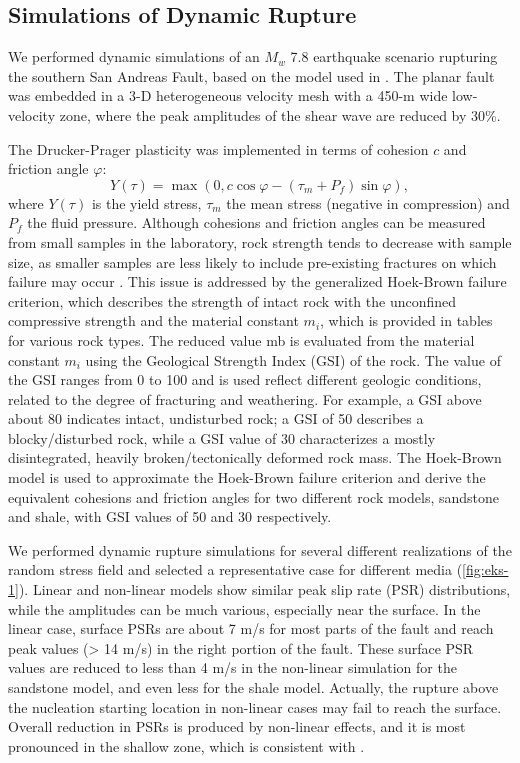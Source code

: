 \subsection{Simulations of Dynamic Rupture}
We performed dynamic simulations of an $M_w$ 7.8 earthquake scenario rupturing the southern San Andreas Fault, based on the model used in \citet{rotenOfffaultDeformationsShallow2017}. The planar fault was embedded in a 3-D heterogeneous velocity mesh \citep[SCEC CVM4;][]{magistraleSCECSouthernCalifornia2000} with a 450-m wide low-velocity zone, where the peak amplitudes of the shear wave are reduced by 30\%.

The Drucker-Prager plasticity was implemented in terms of cohesion $c$ and friction angle $\varphi$:
\begin{equation}\label{eq:eks-1}
    Y(\tau)=\max \left(0, c \cos \varphi-\left(\tau_{m}+P_{f}\right) \sin \varphi\right),
\end{equation}
where $Y(\tau)$ is the yield stress, $\tau_{m}$ the mean stress (negative in compression) and $P_f$ the fluid pressure. Although cohesions and friction angles can be measured from small samples in the laboratory, rock strength tends to decrease with sample size, as smaller samples are less likely to include pre-existing fractures on which failure may occur \citep{wyllie2017rock}. This issue is addressed by the generalized Hoek-Brown failure criterion, which describes the strength of intact rock with the unconfined compressive strength and the material constant $m_i$, which is provided in tables for various rock types. The reduced value mb is evaluated from the material constant $m_i$ using the Geological Strength Index (GSI) of the rock\citep{hoek1980empirical,hoek1997practical}. The value of the GSI ranges from 0 to 100 and is used reflect different geologic conditions, related to the degree of fracturing and weathering. For example, a GSI above about 80 indicates intact, undisturbed rock; a GSI of 50 describes a blocky/disturbed rock, while a GSI value of 30 characterizes a mostly disintegrated, heavily broken/tectonically deformed rock mass. The Hoek-Brown model \citep{evert2002hoek} is used to approximate the Hoek-Brown failure criterion and derive the equivalent cohesions and friction angles for two different rock models, sandstone and shale, with GSI values of 50 and 30 respectively.


We performed dynamic rupture simulations for several different realizations of the random stress field and selected a representative case for different media (\cref{fig:eks-1}). Linear and non-linear models show similar peak slip rate (PSR) distributions, while the amplitudes can be much various, especially near the surface. In the linear case, surface PSRs are about 7 m/s for most parts of the fault and reach peak values (> 14 m/s) in the right portion of the fault. These surface PSR values are reduced to less than 4 m/s in the non-linear simulation for the sandstone model, and even less for the shale model. Actually, the rupture above the nucleation starting location in non-linear cases may fail to reach the surface. Overall reduction in PSRs is produced by non-linear effects, and it is most pronounced in the shallow zone, which is consistent with \citet{rotenExpectedSeismicShaking2014}.

